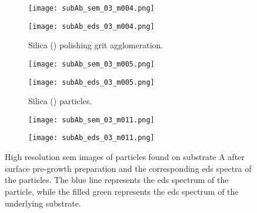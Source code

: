 \begin{figure}
    \centering
    \begin{subfigure}[t]{\textwidth}
          \begin{minipage}[t]{0.49\linewidth}
            \centering
            \texttt{[image: subAb\_sem\_03\_m004.png]}
          \end{minipage}
          \hspace{0.02\linewidth}
          \begin{minipage}[t]{0.49\linewidth}
            \centering
            \texttt{[image: subAb\_eds\_03\_m004.png]}
          \end{minipage}
        \caption{Silica () polishing grit agglomeration.}\label{fig:subAb_silica}
    \end{subfigure}
    \par\bigskip
    \begin{subfigure}[t]{\textwidth}
          \begin{minipage}[t]{0.49\linewidth}
            \centering
            \texttt{[image: subAb\_sem\_03\_m005.png]}
          \end{minipage}
          \hspace{0.02\linewidth}
          \begin{minipage}[t]{0.49\linewidth}
            \centering
            \texttt{[image: subAb\_eds\_03\_m005.png]}
          \end{minipage}
        \caption{Silica () particles.}\label{fig:subAb_silica2}
    \end{subfigure}
    \par\bigskip
    \begin{subfigure}[t]{\textwidth}
          \begin{minipage}[t]{0.49\linewidth}
            \centering
            \texttt{[image: subAb\_sem\_03\_m011.png]}
          \end{minipage}
          \hspace{0.02\linewidth}
          \begin{minipage}[t]{0.49\linewidth}
            \centering
            \texttt{[image: subAb\_eds\_03\_m011.png]}
          \end{minipage}
        \caption{}\label{fig:add_label}
    \end{subfigure}
    \caption[\Ac{sem} images and \ac{eds} spectra of particles found on substrate A after surface pre-growth preparation.]{High resolution \acf{sem} images of particles found on substrate A after surface pre-growth preparation and the corresponding \acf{eds} spectra of the particles. The blue line represents the \ac{eds} spectrum of the particle, while the filled green represents the \ac{eds} spectrum of the underlying substrate.}\label{fig:subAb_sem_w_eds}
\end{figure}

